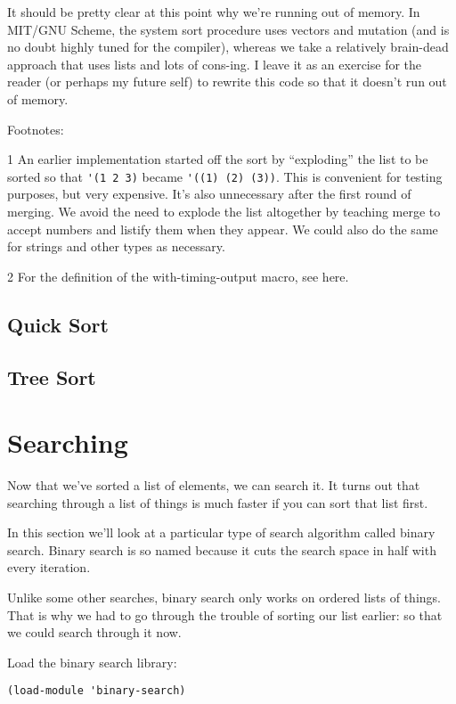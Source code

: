 \documentclass[12pt,openright,draft]{book}
\begin{document}
It should be pretty clear at this point why we're running out of memory. In MIT/GNU Scheme, the system sort procedure uses vectors and mutation (and is no doubt highly tuned for the compiler), whereas we take a relatively brain-dead approach that uses lists and lots of cons-ing. I leave it as an exercise for the reader (or perhaps my future self) to rewrite this code so that it doesn't run out of memory.

Footnotes:

1 An earlier implementation started off the sort by
``exploding'' the list to be sorted so that
\verb|'(1 2 3)| became \verb|'((1) (2) (3))|. This is convenient for
testing purposes, but very expensive. It's also unnecessary after the
first round of merging. We avoid the need to explode the list
altogether by teaching merge to accept numbers and listify them when
they appear. We could also do the same for strings and other types as
necessary.

2 For the definition of the with-timing-output macro, see here.

\section{Quick Sort}

\section{Tree Sort}

\chapter{Searching}

Now that we've sorted a list of elements, we can search it.  It
turns out that searching through a list of things is much faster if
you can sort that list first.

In this section we'll look at a particular type of search algorithm
called binary search.  Binary search is so named because it cuts
the search space in half with every iteration.

Unlike some other searches, binary search only works on ordered
lists of things.  That is why we had to go through the trouble of
sorting our list earlier: so that we could search through it now.

Load the binary search library:

\begin{verbatim}
(load-module 'binary-search)
\end{verbatim}
\end{document}

